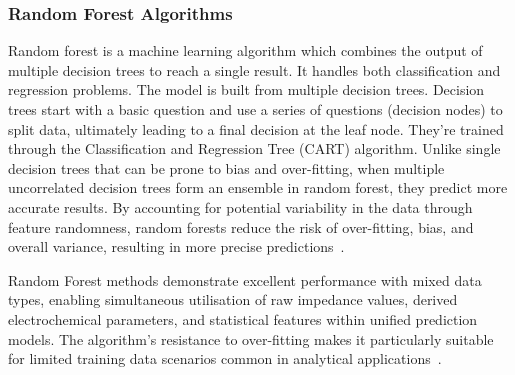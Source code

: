 \subsubsection{Random Forest Algorithms}
Random forest is a machine learning algorithm which combines the output of multiple decision trees to reach a single result. It handles both classification and regression problems.
The model is built from multiple decision trees. Decision trees start with a basic question and use a series of questions (decision nodes) to split data, ultimately leading to a final decision at the leaf node. They're trained through the Classification and Regression Tree (CART) algorithm.
Unlike single decision trees that can be prone to bias and over-fitting, when multiple uncorrelated decision trees form an ensemble in random forest, they predict more accurate results.
By accounting for potential variability in the data through feature randomness, random forests reduce the risk of over-fitting, bias, and overall variance, resulting in more precise predictions~\cite{ibm_randomforest}.

Random Forest methods demonstrate excellent performance with mixed data types, enabling simultaneous utilisation of raw impedance values, derived electrochemical parameters, and statistical features within unified prediction models.
The algorithm's resistance to over-fitting makes it particularly suitable for limited training data scenarios common in analytical applications~\cite{salman_random_2024}.


